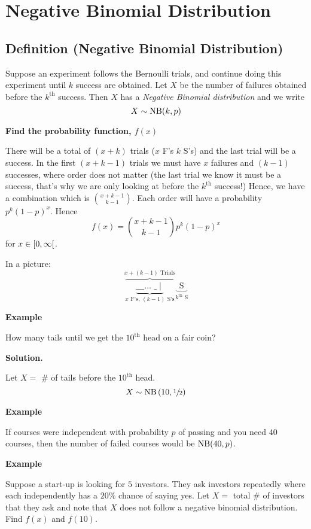 
\section{Negative Binomial Distribution}
\begin{defbox}
    \subsection{Definition (Negative Binomial Distribution)}
    Suppose an experiment follows the Bernoulli trials, and continue
    doing this experiment until $ k $ success are obtained. Let $ X $
    be the number of failures obtained before the $ k^{\text{th}} $
    success. Then $ X $ has a \emph{Negative Binomial distribution}
    and we write
    \[ X \sim \operatorname{NB}(k,p) \]
\end{defbox}

\textbf{Find the probability function, $ f(x)$}

There will be a total of $ (x+k) $ trials ($ x $ F's $ k $ S's)
and the last trial will be a success. In the first $ (x+k-1) $ trials
we must have $ x $ failures and $ (k-1) $ successes, where order does not matter
(the last trial we know it must be a success, that's why we are only looking at
before the $ k^{\text{th}} $ success!)
Hence, we have a combination which is $ \binom{x+k-1}{k-1} $. Each order
will have a probability $ p^k(1-p)^x $. Hence
\[ f(x)=\binom{x+k-1}{k-1}p^k(1-p)^x \]
for $ x\in\rinterval{0}{\infty} $.

In a picture:
\[\overbrace{
        \underbrace{
            \text{\_ \_ \_ $\ldots$ \_}\mid}
        _{x \text{ F's},\,(k-1) \text{ S's}}}^{x+(k-1)\text{ Trials}}
    \underbrace{ \text{ S } }_{ k^{\text{th}} \text{ S}} \]

\textbf{Example}

How many tails until we get the $10^{\text{th}}$ head on a fair coin?

\textbf{Solution.}

Let $ X= $ \# of tails before the $ 10^{\text{th}} $ head.
\[ X\sim\operatorname{NB}\left(10,\sfrac{1}{2}\right) \]

\textbf{Example}

If courses were independent with probability $ p $ of passing
and you need $ 40 $ courses, then the number of failed courses
would be $ \operatorname{NB}(40,p) $.

\textbf{Example}

Suppose a start-up is looking for $ 5 $ investors. They ask
investors repeatedly where each independently has a $ 20\% $ chance
of saying yes. Let $ X= $ total \# of investors that they ask and
note that $ X $ does not follow a negative binomial distribution.
Find $ f(x) $ and $ f(10) $.

